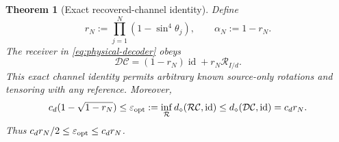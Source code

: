 \documentclass[11pt]{article}
\numberwithin{equation}{section}
\newtheorem{theorem}{Theorem}[section]
\theoremstyle{remark}
\newcommand{\id}{\operatorname{id}}
\newcommand{\Ccal}{\mathcal C}
\newcommand{\Dcal}{\mathcal D}
\newcommand{\Rcal}{\mathcal R}
\newcommand{\eps}{\varepsilon}
\begin{document}
\begin{theorem}[Exact recovered-channel identity]
\label{thm:exact}
Define
\begin{equation}
 r_N:=\prod_{j=1}^N(1-\sin^4\theta_j),\qquad \alpha_N:=1-r_N.
 \label{eq:exact-r}
\end{equation}
The receiver in \eqref{eq:physical-decoder} obeys
\begin{equation}
 \Dcal\Ccal=(1-r_N)\id+r_N\Rcal_{I/d}.
 \label{eq:exact-recovered}
\end{equation}
This exact channel identity permits arbitrary known source-only rotations
and tensoring with any reference. Moreover,
\begin{equation}
 c_d(1-\sqrt{1-r_N})\le
 \eps_{\rm opt}:=\inf_{\mathcal R}d_\diamond(\mathcal R\Ccal,\id)
 \le d_\diamond(\Dcal\Ccal,\id)=c_d r_N.
 \label{eq:exact-sandwich}
\end{equation}
Thus \(c_dr_N/2\le\eps_{\rm opt}\le c_dr_N\).
\end{theorem}
\end{document}
